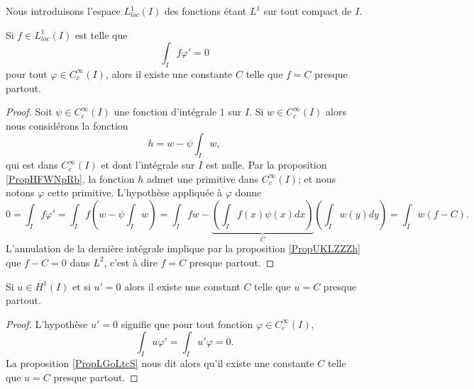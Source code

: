 Nous introduisons l'espace \( L^1_{loc}(I)\) des fonctions étant \( L^1\) sur tout compact de \( I\). 

\begin{proposition} \label{PropLGoLtcS}
    Si \( f\in L^1_{loc}(I)\) est telle que
    \begin{equation}
        \int_If\varphi'=0
    \end{equation}
    pour tout \( \varphi\in  C^{\infty}_c(I)\), alors il existe une constante \( C\) telle que \( f=C\) presque partout.
\end{proposition}

\begin{proof}
    Soit \( \psi\in C^{\infty}_c(I)\) une fonction d'intégrale \( 1\) sur \( I\). Si \( w\in C^{\infty}_c(I)\) alors nous considérons la fonction
    \begin{equation}
        h=w-\psi\int_Iw,
    \end{equation}
    qui est dans \(  C^{\infty}_c(I)\) et dont l'intégrale sur \( I\) est nulle. Par la proposition \ref{PropHFWNpRb}, la fonction \( h\) admet une primitive dans \(  C^{\infty}_c(I)\); et nous notons \( \varphi\) cette primitive. L'hypothèse appliquée à \( \varphi\) donne
    \begin{equation}
        0=\int_If\varphi'=\int_If\left( w-\psi\int_Iw \right)=\int_Ifw-\underbrace{\left( \int_If(x)\psi(x)dx \right)}_C\left( \int_Iw(y)dy \right)=\int_Iw(f-C).
    \end{equation}
    L'annulation de la dernière intégrale implique par la proposition \ref{PropUKLZZZh} que \( f-C=0\) dans \( L^2\), c'est à dire \( f=C\) presque partout.
\end{proof}

\begin{corollary}   \label{CorEVJYihj}
    Si \( u\in H^1(I)\) et si \( u'=0\) alors il existe une constant \( C\) telle que \( u=C\) presque partout.
\end{corollary}

\begin{proof}
    L'hypothèse \( u'=0\) signifie que pour tout fonction \( \varphi\in C^{\infty}_c(I)\),
    \begin{equation}
        \int_Iu\varphi'=\int_Iu'\varphi=0.
    \end{equation}
    La proposition \ref{PropLGoLtcS} nous dit alors qu'il existe une constante \( C\) telle que \( u=C\) presque partout.
\end{proof}

